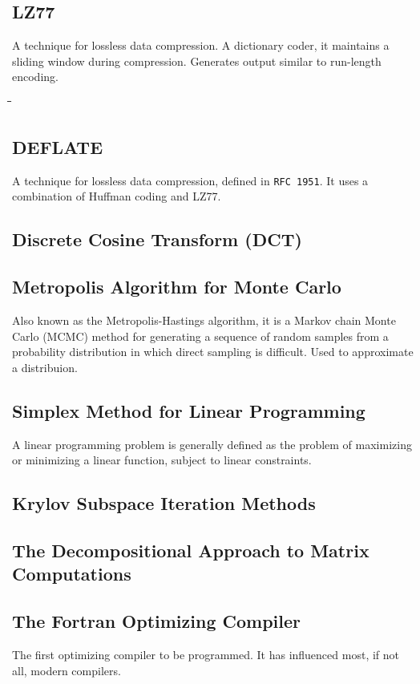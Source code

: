\documentclass[10pt,letterpaper]{scrartcl}
\newcommand{\tabDef}{\hspace{2em}\=\hspace{2em}\=\hspace{2em}\=\hspace{2em}\=\kill}
\begin{document}
\subsection{LZ77}
A technique for lossless data compression. A dictionary coder, it maintains a sliding window during compression. Generates output similar to run-length encoding.
\begin{tabbing}\tabDef 

\end{tabbing}
\subsection{DEFLATE}
A technique for lossless data compression, defined in \texttt{RFC 1951}. It uses a combination of Huffman coding and LZ77. 

\subsection{Discrete Cosine Transform (DCT)}


\subsection{Metropolis Algorithm for Monte Carlo}
Also known as the Metropolis-Hastings algorithm, it is a Markov chain Monte Carlo (MCMC) method for generating a sequence of random samples from a probability distribution in which direct sampling is difficult. Used to approximate a distribuion. 

\subsection{Simplex Method for Linear Programming}
A linear programming problem is generally defined as the problem of maximizing or minimizing a linear function, subject to linear constraints.


\subsection{Krylov Subspace Iteration Methods}


\subsection{The Decompositional Approach to Matrix Computations}


\subsection{The Fortran Optimizing Compiler}
The first optimizing compiler to be programmed. It has influenced most, if not all, modern compilers.
\end{document}
